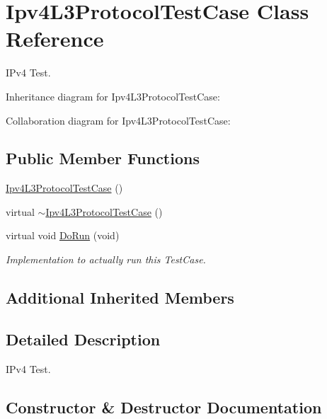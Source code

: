 \hypertarget{classIpv4L3ProtocolTestCase}{}\section{Ipv4\+L3\+Protocol\+Test\+Case Class Reference}
\label{classIpv4L3ProtocolTestCase}


I\+Pv4 Test.  




Inheritance diagram for Ipv4\+L3\+Protocol\+Test\+Case\+:


Collaboration diagram for Ipv4\+L3\+Protocol\+Test\+Case\+:
\subsection*{Public Member Functions}
\begin{DoxyCompactItemize}
\item 
\hyperlink{classIpv4L3ProtocolTestCase_ae37a549987eb00e7daf6e2b9b66640ed}{Ipv4\+L3\+Protocol\+Test\+Case} ()
\item 
virtual \hyperlink{classIpv4L3ProtocolTestCase_a65dead5c53190dc38892187d1c49345c}{$\sim$\+Ipv4\+L3\+Protocol\+Test\+Case} ()
\item 
virtual void \hyperlink{classIpv4L3ProtocolTestCase_a417a62a1f0986595ea291139b775ea85}{Do\+Run} (void)
\begin{DoxyCompactList}\small\item\em Implementation to actually run this Test\+Case. \end{DoxyCompactList}\end{DoxyCompactItemize}
\subsection*{Additional Inherited Members}


\subsection{Detailed Description}
I\+Pv4 Test. 

\subsection{Constructor \& Destructor Documentation}
